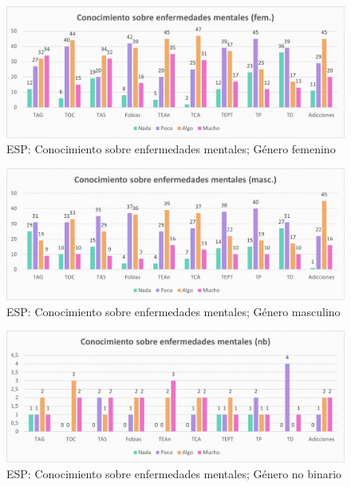 \documentclass[12pt, a4paper,twoside,titlepage]{book}
\begin{document}
\begin{figure}
    \centering
    \includegraphics[width=1\linewidth]{ANEXO ESP/9AnexESPConfem}
    \caption{ESP: Conocimiento sobre enfermedades mentales; Género femenino}
    \label{fig:ESPConfem}
\end{figure}

\begin{figure}
    \centering
    \includegraphics[width=1\linewidth]{ANEXO ESP/10AnexESPConmasc}
    \caption{ESP: Conocimiento sobre enfermedades mentales; Género masculino}
    \label{fig:ESPConmasc}
\end{figure}
\begin{figure}
    \centering
    \includegraphics[width=1\linewidth]{ANEXO ESP/11AnexESPConnb}
    \caption{ESP: Conocimiento sobre enfermedades mentales; Género no binario}
    \label{fig:ESPConnb}
\end{figure}
\end{document}
